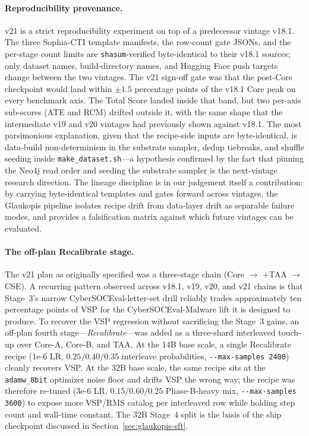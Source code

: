 \documentclass[webpdf,contemporary,large]{oup-authoring-template}
\providecommand{\hfid}[1]{{\small\nolinkurl{#1}}}
\theoremstyle{thmstyleone}
\theoremstyle{thmstyletwo}
\theoremstyle{thmstylethree}
\begin{document}
\paragraph{Reproducibility provenance.}
v21 is a strict reproducibility experiment on top of a predecessor vintage v18.1. The three Sophia-CTI template manifests, the row-count gate JSONs, and the per-stage count limits are \texttt{shasum}-verified byte-identical to their v18.1 sources; only dataset names, build-directory names, and Hugging Face push targets change between the two vintages. The v21 sign-off gate was that the post-Core checkpoint would land within $\pm 1.5$ percentage points of the v18.1 Core peak on every benchmark axis. The Total Score landed inside that band, but two per-axis sub-scores (ATE and RCM) drifted outside it, with the same shape that the intermediate v19 and v20 vintages had previously shown against v18.1. The most parsimonious explanation, given that the recipe-side inputs are byte-identical, is data-build non-determinism in the substrate sampler, dedup tiebreaks, and shuffle seeding inside \hfid{make_dataset.sh}---a hypothesis confirmed by the fact that pinning the Neo4j read order and seeding the substrate sampler is the next-vintage research direction. The lineage discipline is in our judgement itself a contribution: by carrying byte-identical templates and gates forward across vintages, the Glaukopis pipeline isolates recipe drift from data-layer drift as separable failure modes, and provides a falsification matrix against which future vintages can be evaluated.

\paragraph{The off-plan Recalibrate stage.}
The v21 plan as originally specified was a three-stage chain (Core $\to$ +TAA $\to$ CSE). A recurring pattern observed across v18.1, v19, v20, and v21 chains is that Stage~3's narrow CyberSOCEval-letter-set drill reliably trades approximately ten percentage points of VSP for the CyberSOCEval-Malware lift it is designed to produce. To recover the VSP regression without sacrificing the Stage~3 gains, an off-plan fourth stage---\emph{Recalibrate}---was added as a three-shard interleaved touch-up over Core-A, Core-B, and TAA. At the 14B base scale, a single Recalibrate recipe (1e-6 LR, $0.25 / 0.40 / 0.35$ interleave probabilities, \hfid{--max-samples 2400}) cleanly recovers VSP. At the 32B base scale, the same recipe sits at the \hfid{adamw_8bit} optimizer noise floor and drifts VSP the wrong way; the recipe was therefore re-tuned (3e-6 LR, $0.15 / 0.60 / 0.25$ Phase-B-heavy mix, \hfid{--max-samples 3600}) to expose more VSP/RMS catalog per interleaved row while holding step count and wall-time constant. The 32B Stage~4 split is the basis of the ship checkpoint discussed in Section~\ref{sec:glaukopis-sft}.
\end{document}
